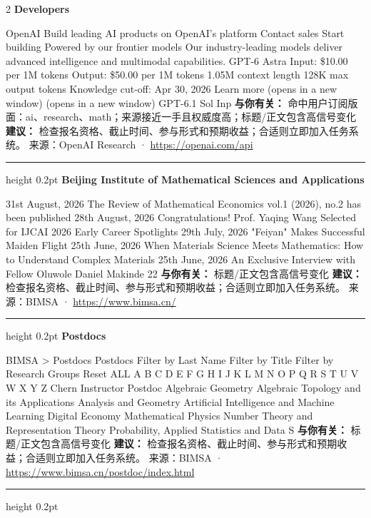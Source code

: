 \documentclass[10.5pt]{ctexart}
\begin{document}
\begin{multicols}{2}
{\large\bfseries Developers}\par
OpenAI Build leading AI products on OpenAI’s platform Contact sales Start building Powered by our frontier models Our industry-leading models deliver advanced intelligence and multimodal capabilities. GPT-6 Astra Input: \$10.00 per 1M tokens Output: \$50.00 per 1M tokens 1.05M context length 128K max output tokens Knowledge cut-off: Apr 30, 2026 Learn more (opens in a new window) (opens in a new window) GPT-6.1 Sol Inp
\textbf{与你有关：} 命中用户订阅版面：ai、research、math；来源接近一手且权威度高；标题/正文包含高信号变化
\textbf{建议：} 检查报名资格、截止时间、参与形式和预期收益；合适则立即加入任务系统。
{\footnotesize\color{ormuted} 来源：OpenAI Research · \url{https://openai.com/api}}
\vspace{2mm}
\hrule height 0.2pt
\vspace{2mm}
{\large\bfseries Beijing Institute of Mathematical Sciences and Applications}\par
31st August, 2026 The Review of Mathematical Economics vol.1 (2026), no.2 has been published 28th August, 2026 Congratulations! Prof. Yaqing Wang Selected for IJCAI 2026 Early Career Spotlights 29th July, 2026 "Feiyan" Makes Successful Maiden Flight 25th June, 2026 When Materials Science Meets Mathematics: How to Understand Complex Materials 25th June, 2026 An Exclusive Interview with Fellow Oluwole Daniel Makinde 22
\textbf{与你有关：} 标题/正文包含高信号变化
\textbf{建议：} 检查报名资格、截止时间、参与形式和预期收益；合适则立即加入任务系统。
{\footnotesize\color{ormuted} 来源：BIMSA · \url{https://www.bimsa.cn/}}
\vspace{2mm}
\hrule height 0.2pt
\vspace{2mm}
{\large\bfseries Postdocs}\par
BIMSA > Postdocs Postdocs Filter by Last Name Filter by Title Filter by Research Groups Reset ALL A B C D E F G H I J K L M N O P Q R S T U V W X Y Z Chern Instructor Postdoc Algebraic Geometry Algebraic Topology and its Applications Analysis and Geometry Artificial Intelligence and Machine Learning Digital Economy Mathematical Physics Number Theory and Representation Theory Probability, Applied Statistics and Data S
\textbf{与你有关：} 标题/正文包含高信号变化
\textbf{建议：} 检查报名资格、截止时间、参与形式和预期收益；合适则立即加入任务系统。
{\footnotesize\color{ormuted} 来源：BIMSA · \url{https://www.bimsa.cn/postdoc/index.html}}
\vspace{2mm}
\hrule height 0.2pt

\end{multicols}
\end{document}
